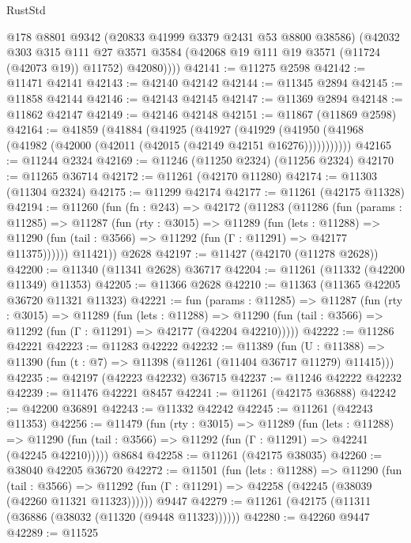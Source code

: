\begin{lexlean}{RustStd}
\begin{coremodule}
          @178
          @8801
          @9342
          (@20833 @41999 @3379 @2431 @53 @8800 @38586)
          (@42032
            @303
            @315
            @111
            @27
            @3571
            @3584
            (@42068 @19 @111 @19 @3571 (@11724 (@42073 @19)) @11752)
            @42080))))
@42141 := @11275 @2598
@42142 := @11471 @42141
@42143 := @42140 @42142
@42144 := @11345 @2894
@42145 := @11858 @42144
@42146 := @42143 @42145
@42147 := @11369 @2894
@42148 := @11862 @42147
@42149 := @42146 @42148
@42151 := @11867 (@11869 @2598)
@42164 := @41859
    (@41884
      (@41925
        (@41927
          (@41929 (@41950 (@41968 (@41982 (@42000 (@42011 (@42015 (@42149 @42151 @16276)))))))))))
@42165 := @11244 @2324
@42169 := @11246 (@11250 @2324) (@11256 @2324)
@42170 := @11265 @36714
@42172 := @11261 (@42170 @11280)
@42174 := @11303 (@11304 @2324)
@42175 := @11299 @42174
@42177 := @11261 (@42175 @11328)
@42194 := @11260
    (fun (fn : @243) =>
    @42172
      (@11283
        (@11286
          (fun (params : @11285) =>
          @11287
            (fun (rty : @3015) =>
            @11289
              (fun (lets : @11288) =>
              @11290 (fun (tail : @3566) => @11292 (fun (Γ : @11291) => @42177 @11375))))))
        @11421))
    @2628
@42197 := @11427 (@42170 (@11278 @2628))
@42200 := @11340 (@11341 @2628) @36717
@42204 := @11261 (@11332 (@42200 @11349) @11353)
@42205 := @11366 @2628
@42210 := @11363 (@11365 @42205 @36720 @11321 @11323)
@42221 := fun (params : @11285) =>
  @11287
    (fun (rty : @3015) =>
    @11289
      (fun (lets : @11288) =>
      @11290 (fun (tail : @3566) => @11292 (fun (Γ : @11291) => @42177 (@42204 @42210)))))
@42222 := @11286 @42221
@42223 := @11283 @42222
@42232 := @11389
    (fun (U : @11388) => @11390 (fun (t : @7) => @11398 (@11261 (@11404 @36717 @11279) @11415)))
@42235 := @42197 (@42223 @42232) @36715
@42237 := @11246 @42222 @42232
@42239 := @11476 @42221 @8457
@42241 := @11261 (@42175 @36888)
@42242 := @42200 @36891
@42243 := @11332 @42242
@42245 := @11261 (@42243 @11353)
@42256 := @11479
    (fun (rty : @3015) =>
    @11289
      (fun (lets : @11288) =>
      @11290 (fun (tail : @3566) => @11292 (fun (Γ : @11291) => @42241 (@42245 @42210)))))
    @8684
@42258 := @11261 (@42175 @38035)
@42260 := @38040 @42205 @36720
@42272 := @11501
    (fun (lets : @11288) =>
    @11290
      (fun (tail : @3566) =>
      @11292 (fun (Γ : @11291) => @42258 (@42245 (@38039 (@42260 @11321 @11323))))))
    @9447
@42279 := @11261 (@42175 (@11311 (@36886 (@38032 (@11320 (@9448 @11323))))))
@42280 := @42260 @9447
@42289 := @11525

\end{coremodule}
\end{lexlean}
